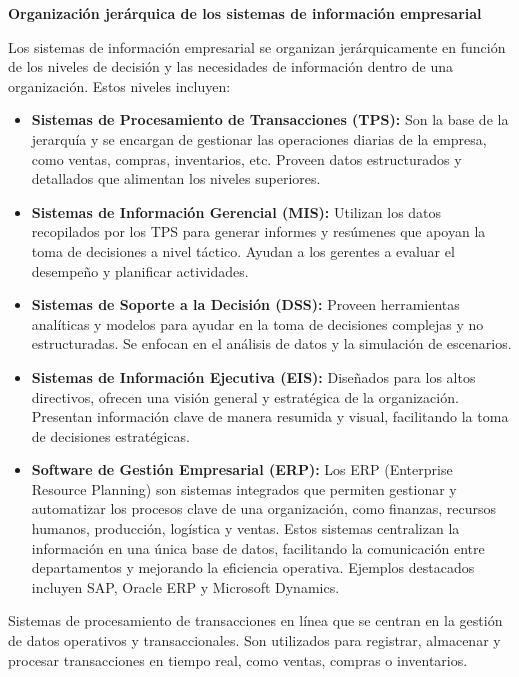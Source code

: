 \documentclass[12pt]{report} %
\begin{document}
\textbf{Organización jerárquica de los sistemas de información
empresarial}

Los sistemas de información empresarial se organizan jerárquicamente en
función de los niveles de decisión y las necesidades de información
dentro de una organización. Estos niveles incluyen:

\begin{itemize}
\item
  \textbf{Sistemas de Procesamiento de Transacciones (TPS):} Son la base
  de la jerarquía y se encargan de gestionar las operaciones diarias de
  la empresa, como ventas, compras, inventarios, etc. Proveen datos
  estructurados y detallados que alimentan los niveles superiores.
\item
  \textbf{Sistemas de Información Gerencial (MIS):} Utilizan los datos
  recopilados por los TPS para generar informes y resúmenes que apoyan
  la toma de decisiones a nivel táctico. Ayudan a los gerentes a evaluar
  el desempeño y planificar actividades.
\item
  \textbf{Sistemas de Soporte a la Decisión (DSS):} Proveen herramientas
  analíticas y modelos para ayudar en la toma de decisiones complejas y
  no estructuradas. Se enfocan en el análisis de datos y la simulación
  de escenarios.
\item
  \textbf{Sistemas de Información Ejecutiva (EIS):} Diseñados para los
  altos directivos, ofrecen una visión general y estratégica de la
  organización. Presentan información clave de manera resumida y visual,
  facilitando la toma de decisiones estratégicas.
\item
  \textbf{Software de Gestión Empresarial (ERP):} Los ERP (Enterprise
  Resource Planning) son sistemas integrados que permiten gestionar y
  automatizar los procesos clave de una organización, como finanzas,
  recursos humanos, producción, logística y ventas. Estos sistemas
  centralizan la información en una única base de datos, facilitando la
  comunicación entre departamentos y mejorando la eficiencia operativa.
  Ejemplos destacados incluyen SAP, Oracle ERP y Microsoft Dynamics.
\end{itemize}


\begin{definicion}
Sistemas de procesamiento de transacciones en línea que se centran en la gestión de datos operativos y transaccionales. Son utilizados para registrar, almacenar y procesar transacciones en tiempo real, como ventas, compras o inventarios.
\end{definicion}
\end{document}
